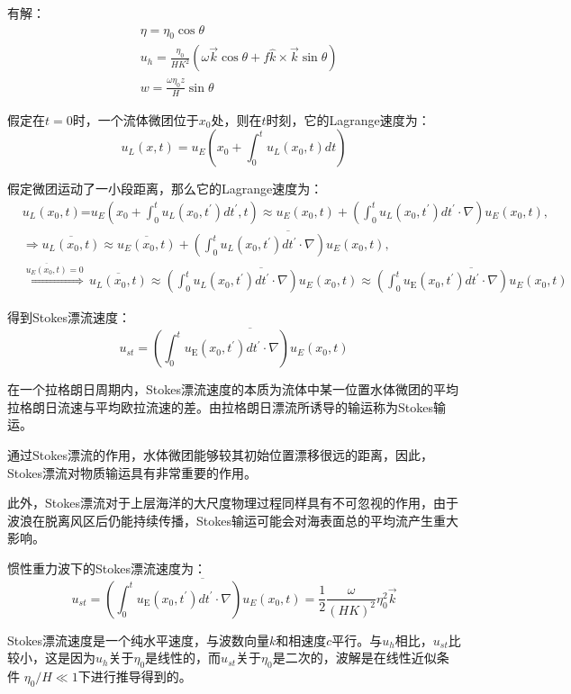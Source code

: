 \documentclass{article}
\begin{document}
有解：
\begin{align}
    &\eta = \eta_0\cos\theta \\
    &u_h = \frac{\eta_0}{HK^2}(\omega\vec{k}\cos\theta + f\hat{k}\times\vec{k}\sin\theta)\\
    &w = \frac{\omega\eta_0z}{H}\sin\theta
\end{align}

假定在$t=0$时，一个流体微团位于$x_0$处，则在$t$时刻，它的Lagrange速度为：
$$u_L(x,t) = u_E(x_0 + \int_0^t u_L(x_0, t) dt)$$

假定微团运动了一小段距离，那么它的Lagrange速度为：
\begin{align}
  & {{u}_{L}}({{x}_{0}},t)\text{=}{{u}_{E}}({{x}_{0}}+\int_{0}^{t}{{{u}_{L}}({{x}_{0}},t^{\prime})}dt^{\prime},t)\approx {{u}_{E}}({{x}_{0}},t)+(\int_{0}^{t}{{{u}_{L}}({{x}_{0}},t^{\prime})}dt^{\prime}\cdot \nabla ){{u}_{E}}({{x}_{0}},t), \\ 
 & \Rightarrow \overline{{{u}_{L}}({{x}_{0}},t)}\approx \overline{{{u}_{E}}({{x}_{0}},t)}+\overline{(\int_{0}^{t}{{{u}_{L}}({{x}_{0}},t^{\prime})}dt^{\prime}\cdot \nabla ){{u}_{E}}({{x}_{0}},t)}, \\ 
 & \overset{\overline{{{u}_{E}}({{x}_{0}},t)}=0}{\mathop{\Rightarrow }}\,\overline{{{u}_{L}}({{x}_{0}},t)}\approx \overline{(\int_{0}^{t}{{{u}_{L}}({{x}_{0}},t^{\prime})}dt^{\prime}\cdot \nabla ){{u}_{E}}({{x}_{0}},t)}\approx \overline{(\int_{0}^{t}{{{u}_{\text{E}}}({{x}_{0}},t^{\prime})}dt^{\prime}\cdot \nabla ){{u}_{E}}({{x}_{0}},t)}
\end{align}

得到Stokes漂流速度：
$$u_{st}=\overline{(\int_{0}^{t}{{{u}_{\text{E}}}({{x}_{0}},t^{\prime})}dt^{\prime}\cdot \nabla ){{u}_{E}}({{x}_{0}},t)}$$

在一个拉格朗日周期内，Stokes漂流速度的本质为流体中某一位置水体微团的平均拉格朗日流速与平均欧拉流速的差。由拉格朗日漂流所诱导的输运称为Stokes输运。

通过Stokes漂流的作用，水体微团能够较其初始位置漂移很远的距离，因此，Stokes漂流对物质输运具有非常重要的作用。

此外，Stokes漂流对于上层海洋的大尺度物理过程同样具有不可忽视的作用，由于波浪在脱离风区后仍能持续传播，Stokes输运可能会对海表面总的平均流产生重大影响。

惯性重力波下的Stokes漂流速度为：
$$u_{st}=\overline{(\int_{0}^{t}{{{u}_{\text{E}}}({{x}_{0}},t^{\prime})}dt^{\prime}\cdot \nabla ){{u}_{E}}({{x}_{0}},t)} = \frac{1}{2}\frac{\omega}{(HK)^2}\eta_0^2\vec{k}$$

Stokes漂流速度是一个纯水平速度，与波数向量$k$和相速度$c$平行。与$u_h$相比，$u_{st}$比较小，这是因为$u_h$关于$\eta_0$是线性的，而$u_{st}$关于$\eta_0$是二次的，波解是在线性近似条件 $\eta_0/H \ll 1$下进行推导得到的。
\end{document}
